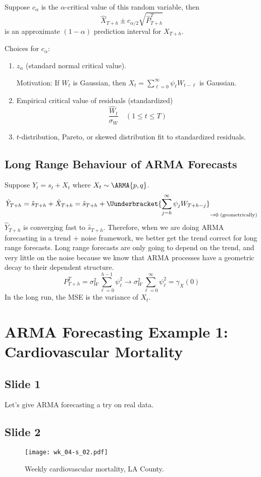Suppose $ c_\alpha $ is the $ \alpha $-critical value of this random variable,
then
\[ \hat{X}_{T+h}\pm c_{\alpha/2}\sqrt{\hat{P}_{T+h}^T} \]
is an approximate $ (1-\alpha) $ prediction interval for $ X_{T+h} $.

Choices for $ c_\alpha $:
\begin{enumerate}[(1)]
    \item $ z_\alpha $ (standard normal critical value).

          Motivation: If $ W_t $ is Gaussian, then $ X_t=\sum_{\ell=0}^{\infty} \psi_\ell W_{t-\ell} $
          is Gaussian.
    \item Empirical critical value of residuals (standardized)
          \[ \frac{\hat{W}_{t}}{\sigma_W}\quad(1\le t\le T)  \]
    \item $ t $-distribution, Pareto, or skewed distribution fit to standardized residuals.
\end{enumerate}

\subsection*{Long Range Behaviour of ARMA Forecasts}
Suppose $ Y_t=s_t+X_t $ where $ X_t \sim \ARMA{p,q} $.
\[ \hat{Y}_{T+h}=\hat{s}_{T+h}+\hat{X}_{T+h}=\hat{s}_{T+h}+\Uunderbracket{\sum_{j=h}^{\infty} \psi_j W_{T+h-j}}_{\to 0\text{ (geometrically)}} \]
$ \hat{Y}_{T+h} $ is converging fast to $ \hat{s}_{T+h} $. {\color{blue}Therefore, when we are doing ARMA
        forecasting in a trend + noise framework, we better get the trend correct for long range
        forecasts. Long range forecasts are only going to depend on the trend, and very
        little on the noise because we know that ARMA processes have a geometric decay to
        their dependent structure.}
\[ P_{T+h}^T=\sigma_W^2 \sum_{\ell=0}^{h-1} \psi_\ell^2\to \sigma_W^2 \sum_{\ell=0}^{\infty} \psi_\ell^2=\gamma_X(0) \]
In the long run, the MSE is the variance of $ X_t $.

\section{ARMA Forecasting Example 1: Cardiovascular Mortality}
\subsection*{Slide 1}
Let's give ARMA forecasting a try on real data.

\subsection*{Slide 2}
\begin{figure}[H]
    \centering
    \texttt{[image: wk\_04-s\_02.pdf]}
    \caption{Weekly cardiovascular mortality, LA County.}
\end{figure}

